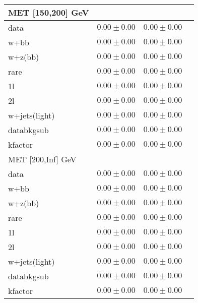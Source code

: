 \begin{table}
\begin{center}
\begin{tabular}{lccc}
\hline\hline
\hline
MET [150,200] GeV   & &\\
\hline
data&$0.00\pm0.00$&$0.00\pm0.00$\\
\hline
w+bb&$0.00\pm0.00$&$0.00\pm0.00$\\
w+z(bb)&$0.00\pm0.00$&$0.00\pm0.00$\\
rare&$0.00\pm0.00$&$0.00\pm0.00$\\
1l&$0.00\pm0.00$&$0.00\pm0.00$\\
2l&$0.00\pm0.00$&$0.00\pm0.00$\\
w+jets(light)&$0.00\pm0.00$&$0.00\pm0.00$\\
\hline
databkgsub&$0.00\pm0.00$&$0.00\pm0.00$\\
kfactor&$0.00\pm0.00$&$0.00\pm0.00$\\
\hline\hline
\hline
MET [200,Inf] GeV & &\\
\hline
data&$0.00\pm0.00$&$0.00\pm0.00$\\
\hline
w+bb&$0.00\pm0.00$&$0.00\pm0.00$\\
w+z(bb)&$0.00\pm0.00$&$0.00\pm0.00$\\
rare&$0.00\pm0.00$&$0.00\pm0.00$\\
1l&$0.00\pm0.00$&$0.00\pm0.00$\\
2l&$0.00\pm0.00$&$0.00\pm0.00$\\
w+jets(light)&$0.00\pm0.00$&$0.00\pm0.00$\\
\hline
databkgsub&$0.00\pm0.00$&$0.00\pm0.00$\\
kfactor&$0.00\pm0.00$&$0.00\pm0.00$\\
\hline\hline
\hline
\end{tabular}
\end{center}
\end{table}
